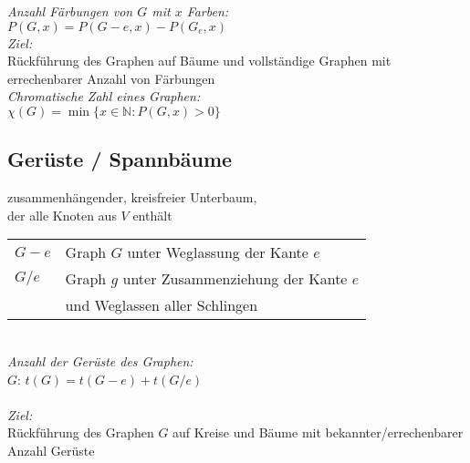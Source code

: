 \textit{Anzahl Färbungen von $G$ mit $x$ Farben:} \\
$P(G,x)=P(G-e,x)-P(G_e,x)$ \\

\textit{Ziel:} \\
Rückführung des Graphen auf Bäume und vollständige Graphen mit errechenbarer Anzahl von Färbungen \\

\textit{Chromatische Zahl eines Graphen:} \\
$\chi(G) = \min\{x \in \mathbb{N} : P(G,x) > 0\}$

\subsection{Gerüste / Spannbäume}
zusammenhängender, kreisfreier Unterbaum, \\
der alle Knoten aus $V$ enthält \\

\begin{tabular}{@{}ll}
    $G-e$ & Graph $G$ unter Weglassung der Kante $e$ \\
    $G/e$ & Graph $g$ unter Zusammenziehung der Kante $e$ \\ 
    & und Weglassen aller Schlingen
\end{tabular} \\

\textit{Anzahl der Gerüste des Graphen:} \\
$G$: $t(G)=t(G-e)+t(G/e)$ \\
\\
\textit{Ziel:} \\
Rückführung des Graphen $G$ auf Kreise und Bäume mit bekannter/errechenbarer Anzahl Gerüste

